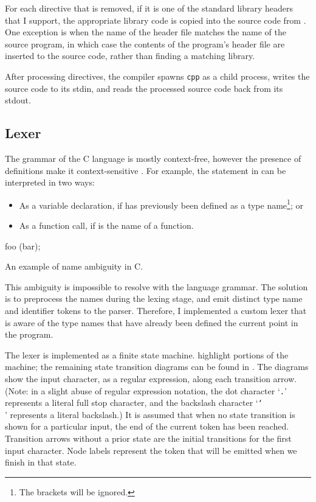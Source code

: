 \documentclass[00-main.tex]{subfiles}
\begin{document}
For each  directive that is removed, if it is one of the standard library headers that I support, the appropriate library code is copied into the source code from .
One exception is when the name of the header file matches the name of the source program, in which case the contents of the program's header file are inserted to the source code, rather than finding a matching library.

After processing  directives, the compiler spawns \texttt{cpp} as a child process, writes the source code to its stdin, and reads the processed source code back from its stdout.

\subsection{Lexer}

The grammar of the C language is mostly context-free, however the presence of  definitions make it context-sensitive .
For example, the statement in  can be interpreted in two ways:
\begin{itemize}
\item As a variable declaration, if  has previously been defined as a type name\footnote{The brackets will be ignored.}; or
\item As a function call, if  is the name of a function.
\end{itemize}

\begin{listing}[H]
  \begin{CListing}
  foo (bar);
  \end{CListing}
  \caption{An example of  name ambiguity in C.}
  \label{lst:typedef name ambiguity example}
\end{listing}

This ambiguity is impossible to resolve with the language grammar. The solution is to preprocess the  names during the lexing stage, and emit distinct type name and identifier tokens to the parser.
Therefore, I implemented a custom lexer that is aware of the type names that have already been defined the current point in the program.

The lexer is implemented as a finite state machine.  highlight portions of the machine; the remaining state transition diagrams can be found in .
The diagrams show the input character, as a regular expression, along each transition arrow. (Note: in a slight abuse of regular expression notation, the dot character `\texttt{.}' represents a literal full stop character, and the backslash character `\texttt{\char`\\}' represents a literal backslash.)
It is assumed that when no state transition is shown for a particular input, the end of the current token has been reached.
Transition arrows without a prior state are the initial transitions for the first input character.
Node labels represent the token that will be emitted when we finish in that state.
\end{document}
